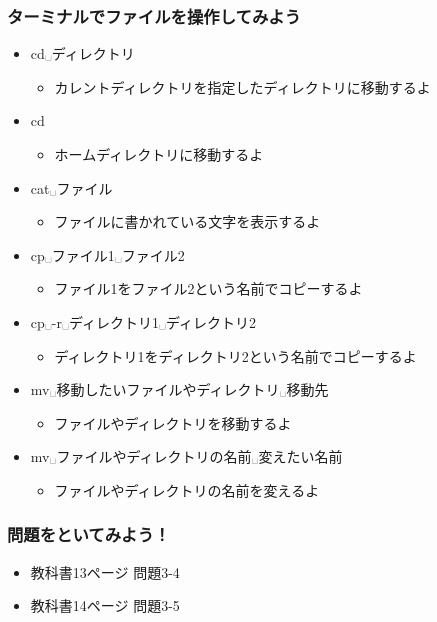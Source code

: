 \begin{frame}
    \frametitle{ターミナルでファイルを操作してみよう}
    \begin{itemize}
        \item cd␣ディレクトリ
        \begin{itemize}
            \item カレントディレクトリを指定したディレクトリに移動するよ
        \end{itemize}
        \item cd
        \begin{itemize}
            \item ホームディレクトリに移動するよ
        \end{itemize}
        \item cat␣ファイル
        \begin{itemize}
            \item ファイルに書かれている文字を表示するよ
        \end{itemize}
        \item cp␣ファイル1␣ファイル2
        \begin{itemize}
            \item ファイル1をファイル2という名前でコピーするよ
        \end{itemize}
        \item cp␣-r␣ディレクトリ1␣ディレクトリ2
        \begin{itemize}
            \item ディレクトリ1をディレクトリ2という名前でコピーするよ
        \end{itemize}
        \item mv␣移動したいファイルやディレクトリ␣移動先
        \begin{itemize}
            \item ファイルやディレクトリを移動するよ
        \end{itemize}
        \item mv␣ファイルやディレクトリの名前␣変えたい名前
        \begin{itemize}
            \item ファイルやディレクトリの名前を変えるよ
        \end{itemize}
    \end{itemize}
\end{frame}

\begin{frame}
    \frametitle{問題をといてみよう！}
    \begin{itemize}
        \item 教科書13ページ 問題3-4
        \item 教科書14ページ 問題3-5
    \end{itemize}
\end{frame}

